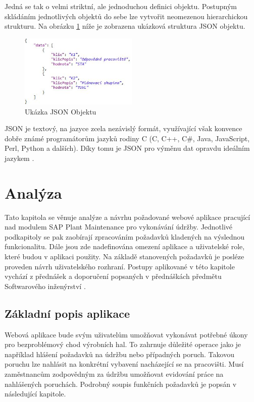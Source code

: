 \documentclass[thesis=M,czech]{FITthesis}[2012/06/26]
\begin{document}
Jedná se tak o velmi striktní, ale jednoduchou definici objektu. Postupným skládáním jednotlivých objektů do sebe lze vytvořit neomezenou hierarchickou strukturu. Na obrázku \ref{img:json} níže je zobrazena ukázková struktura JSON objektu.

\begin{figure}[H]
	\centering
	\includegraphics[width=0.5\textwidth]{images/json}
	\caption{Ukázka JSON Objektu}
	\label{img:json}
\end{figure}

JSON je textový, na jazyce zcela nezávislý formát, využívající však konvence dobře známé programátorům jazyků rodiny C (C, C++, C\#, Java, JavaScript, Perl, Python a dalších). Díky tomu je JSON pro výměnu dat opravdu ideálním jazykem \cite{json}.



\chapter{Analýza}
\label{chap:analyza}
Tato kapitola se věnuje analýze a návrhu požadované webové aplikace pracující nad modulem SAP Plant Maintenance pro vykonávání údržby. Jednotlivé podkapitoly se pak zaobírají zpracováním požadavků kladených na výslednou funkcionalitu. Dále jsou zde nadefinována omezení aplikace a uživatelské role, které budou v aplikaci použity. Na základě stanovených požadavků je posléze proveden návrh uživatelského rozhraní. Postupy aplikované v této kapitole vychází z přednášek a doporučení popsaných v přednáškách předmětu Softwarového inženýrství \cite{edux_si}. 

\section{Základní popis aplikace}
Webová aplikace bude svým uživatelům umožňovat vykonávat potřebné úkony pro bezproblémový chod výrobních hal. To zahrnuje důležité operace jako je například hlášení požadavků na údržbu nebo případných poruch. Takovou poruchu lze nahlásit na konkrétní vybavení nacházející se na pracovišti. Musí zaměstnancům zodpovědným za údržbu umožňovat evidování práce na nahlášených poruchách. Podrobný soupis funkčních požadavků je popsán v následující kapitole. 
\end{document}
